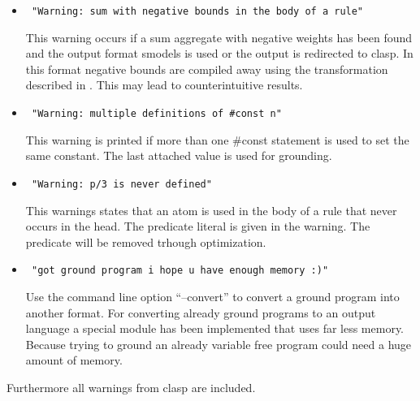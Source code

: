 \documentclass[a4paper,10pt]{article}
\begin{document}
\begin{itemize}
 \item 
\begin{verbatim}
 "Warning: sum with negative bounds in the body of a rule"
\end{verbatim}
This warning occurs if a sum aggregate with negative weights has been found and the output format smodels is used or the output is redirected to clasp. In this format negative bounds are compiled away using the transformation described in \cite{lparseManual}. This may lead to counterintuitive results.
 \item 
\begin{verbatim}
 "Warning: multiple definitions of #const n"
\end{verbatim}
This warning is printed if more than one \#const statement is used to set the same constant.
The last attached value is used for grounding.
\item
\begin{verbatim}
 "Warning: p/3 is never defined"
\end{verbatim}
This warnings states that an atom is used in the body of a rule that never occurs in the head.
The predicate literal is given in the warning. The predicate will be removed trhough optimization.
\item
\begin{verbatim}
 "got ground program i hope u have enough memory :)"
\end{verbatim}
Use the command line option ``--convert'' to convert a ground program into another format.
For converting already ground programs to an output language a special module has been implemented that uses far less memory. Because trying to ground an already variable free program could need a huge amount of memory.

\end{itemize}
Furthermore all warnings from clasp are included.
\end{document}
